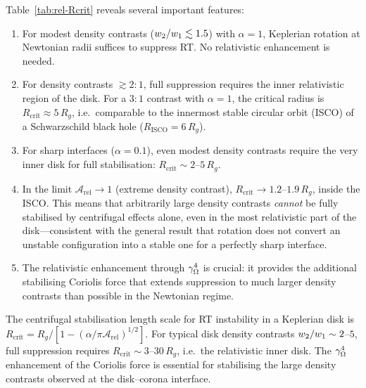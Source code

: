 \noindent
Table~\ref{tab:rel-Rcrit} reveals several important features:
\begin{enumerate}
\item For modest density contrasts ($w_{2}/w_{1}
  \lesssim 1.5$) with $\alpha = 1$, Keplerian rotation at
  Newtonian radii suffices to suppress RT.  No relativistic
  enhancement is needed.

\item For density contrasts $\gtrsim 2:1$, full suppression
  requires the inner relativistic region of the disk.  For a
  $3:1$ contrast with $\alpha = 1$, the critical radius is
  $R_{\mathrm{crit}} \approx 5\,R_{g}$, i.e.\ comparable to the
  innermost stable circular orbit (ISCO) of a Schwarzschild
  black hole ($R_{\mathrm{ISCO}} = 6\,R_{g}$).

\item For sharp interfaces ($\alpha = 0.1$), even modest density
  contrasts require the very inner disk for full stabilisation:
  $R_{\mathrm{crit}} \sim 2$--$5\,R_{g}$.

\item In the limit $\mathcal{A}_{\mathrm{rel}} \to 1$ (extreme
  density contrast), $R_{\mathrm{crit}} \to 1.2$--$1.9\,R_{g}$,
  inside the ISCO.  This means that arbitrarily large density
  contrasts \emph{cannot} be fully stabilised by centrifugal
  effects alone, even in the most relativistic part of the
  disk---consistent with the general result that rotation does
  not convert an unstable configuration into a stable one for
  a perfectly sharp interface.

\item The relativistic enhancement through $\gamma_{\Omega}^{4}$ is
  crucial: it provides the additional stabilising Coriolis force
  that extends suppression to much larger density contrasts than
  possible in the Newtonian regime.
\end{enumerate}

\begin{relcorrection}
The centrifugal stabilisation length scale for RT instability in a
Keplerian disk is $R_{\mathrm{crit}} = R_{g}/[1 -
(\alpha/\pi\mathcal{A}_{\mathrm{rel}})^{1/2}]$.  For typical
disk density contrasts $w_{2}/w_{1} \sim 2$--$5$,
full suppression requires $R_{\mathrm{crit}} \sim 3$--$30\,R_{g}$,
i.e.\ the relativistic inner disk.  The $\gamma_{\Omega}^{4}$
enhancement of the Coriolis force is essential for stabilising
the large density contrasts observed at the disk--corona interface.
\end{relcorrection}
